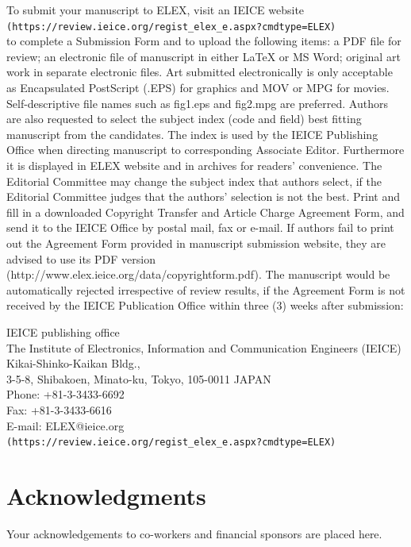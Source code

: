 \documentclass{elex}
\begin{document}
To submit your manuscript to ELEX, visit an IEICE website \\
\verb+(https://review.ieice.org/regist_elex_e.aspx?cmdtype=ELEX)+ \\
to complete a Submission Form and to upload the following items: 
a PDF file for review; an electronic file of manuscript in either 
LaTeX or MS Word; original art work in separate electronic files. 
Art submitted electronically is only acceptable as Encapsulated 
PostScript (.EPS) for graphics and MOV or MPG for movies. 
Self-descriptive file names such as fig1.eps and fig2.mpg are preferred.  
Authors are also requested to select the subject index (code and field) 
best fitting manuscript from the candidates. The index is used by the 
IEICE Publishing Office when directing manuscript to corresponding 
Associate Editor. Furthermore it is displayed in ELEX website and 
in archives for readers' convenience. The Editorial Committee may 
change the subject index that authors select, if the Editorial Committee 
judges that the authors' selection is not the best. Print and fill in 
a downloaded Copyright Transfer and Article Charge Agreement Form, and 
send it to the IEICE Office by postal mail, fax or e-mail. 
If authors fail to print out the Agreement Form provided in manuscript 
submission website, they are advised to use its PDF version 
(http://www.elex.ieice.org/data/copyrightform.pdf). 
The manuscript would be automatically rejected irrespective of 
review results, if the Agreement Form is not received by the 
IEICE Publication Office within three (3) weeks after submission:
\\

\quad \begin{minipage}{11cm}
\noindent
IEICE publishing office\\
The Institute of Electronics, Information and Communication Engineers (IEICE)\\
Kikai-Shinko-Kaikan Bldg.,\\
3-5-8, Shibakoen, Minato-ku, Tokyo, 105-0011 JAPAN\\
Phone: +81-3-3433-6692\\
Fax: +81-3-3433-6616\\
E-mail: ELEX@ieice.org\\
\verb+(https://review.ieice.org/regist_elex_e.aspx?cmdtype=ELEX)+
\end{minipage}

\section*{Acknowledgments}

Your acknowledgements to co-workers and financial sponsors are placed here.
\end{document}
